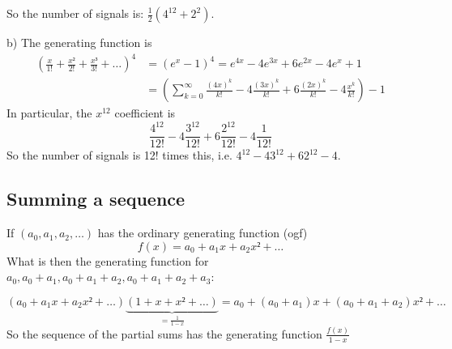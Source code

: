 \documentclass[english]{lbscript}
\begin{document}
\begin{example}{}{}
So the number of signals is: \(\frac{1}{2} \left(4^{12}+2^{2} \right) \).

b) The generating function is
\begin{align}
\label{eq:50}
  \left(\frac{x}{1!} + \frac{x²}{2!}+ \frac{x³}{3!} + \dots \right)^{4}
  &= \left(e^{x}-1 \right)^{4} = e^{4x}-4e^{3x}+6e^{2x}-4e^{x}+1 \\
  &= \left(∑_{k=0}^{∞} \frac{(4x)^{k}}{k!} - 4 \frac{(3x)^{k}}{k!} + 6 \frac{(2x)^{k}}{k!} - 4 \frac{x^{k}}{k!} \right) - 1
\end{align}
In particular, the \(x^{12}\) coefficient is
\begin{equation}
\label{eq:51}
\frac{4^{12}}{12!} - 4 \frac{3^{12}}{12!} + 6 \frac{2^{12}}{12!} - 4 \frac{1}{12!}
\end{equation}
So the number of signals is 12! times this, i.e. \(4^{12}-4 3^{12} + 6 2^{12} - 4\).
\end{example}

\subsection{Summing a sequence}
\label{sec:summing-sequence}

If \((a_0, a_1, a_2, \dots)\) has the ordinary generating function (ogf)
\begin{equation}
\label{eq:52}
f(x) = a_0 + a_1x + a_2x²+\dots
\end{equation}
What is then the generating function for \(a_0, a_0+a_1, a_0+a_1+a_2, a_0+a_1+a_2+a_3\):

\begin{equation}
\label{eq:53}
\left(a_0+a_1x+a_2x²+\dots\right) \underbrace{\left(1+x+x²+\dots \right) }_{= \frac{1}{1-x}} = a_0 + (a_0+a_1)x+ (a_0+a_1+a_2)x²+\dots
\end{equation}
So the sequence of the partial sums has the generating function \(\frac{f(x)}{1-x}\)
\end{document}
